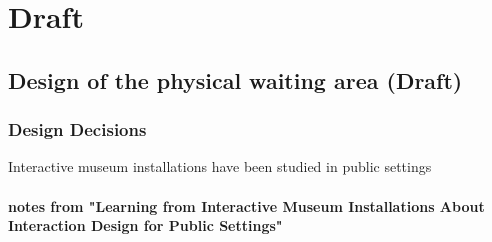 \chapter{Draft}
\section{Design of the physical waiting area (Draft)}
\subsection{Design Decisions}
Interactive museum installations have been studied in public settings \cite{hornecker_learning_2006}
\subsubsection{notes from "Learning from Interactive Museum Installations  About Interaction Design for Public Settings"}

